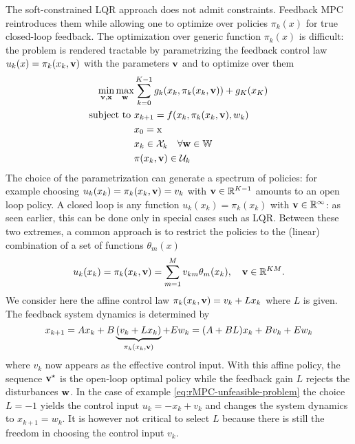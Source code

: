 The soft-constrained LQR approach does not admit constraints. Feedback MPC reintroduces them while allowing one to optimize over policies $\pi_k(x)$ for true closed-loop feedback. The optimization over generic function $\pi_k(x)$ is difficult: the problem is rendered tractable by parametrizing the feedback control law $u_k(x) = \pi_k(x_k,\boldsymbol{\mathrm{v}})$ with the parameters $\boldsymbol{\mathrm{v}}$ and to optimize over them
\begin{equation}
  \label{eq:feedback-MPC}
  \begin{aligned}
    \min_{\bsv,\bsx} \max_{\bsw} & \sum_{k=0}^{K-1} g_k(x_k,\pi_k(x_k,\bsv)) + g_K(x_K) \\
    \text{subject to } & x_{k+1} = f(x_k,\pi_k(x_k,\bsv),w_k) \\
                                 & x_0 = \mathrm{x} \\
                                 & x_k \in \mathcal{X}_k\quad \forall \bsw \in \mathbb{W} \\
                                 & \pi(x_k,\bsv) \in \mathcal{U}_k %
  \end{aligned}
\end{equation}
The choice of the parametrization can generate a spectrum of policies: for example choosing $u_k(x_k) = \pi_k(x_k,\boldsymbol{\mathrm{v}}) = v_k$ with $\boldsymbol{\mathrm{v}}\in \mathbb{R}^{K-1}$ amounts to an open loop policy. A closed loop is any function $u_k(x_k)=\pi_k(x_k)$ with $\boldsymbol{\mathrm{v}}\in \mathbb{R}^\infty$: as seen earlier, this can be done only in special cases such as LQR. Between these two extremes, a common approach is to restrict the policies to the (linear) combination of a set of functions $\theta_m(x)$
\begin{equation*}
  u_k(x_k) = \pi_k(x_k,\boldsymbol{\mathrm{v}}) = \sum_{m=1}^M v_{km}\theta_m(x_k),\quad \boldsymbol{\mathrm{v}}\in \mathbb{R}^{KM}.
\end{equation*}
We consider here the affine control law $\pi_k(x_k,\boldsymbol{\mathrm{v}}) = v_k + Lx_k$ where $L$ is given. The feedback system dynamics is determined by
\begin{equation*}
  x_{k+1} = Ax_k + B\underbrace{(v_k+Lx_k)}_{\pi_k(x_k,\boldsymbol{\mathrm{v}})} + Ew_k = (A+BL)x_k + Bv_k + Ew_k
\end{equation*}
where $v_k$ now appears as the effective control input. With this affine policy, the sequence $\boldsymbol{\mathrm{v}}^\star$ is the open-loop optimal policy while the feedback gain $L$ rejects the disturbances $\boldsymbol{\mathrm{w}}$. In the case of example \ref{eq:rMPC-unfeasible-problem} the choice $L=-1$ yields the control input $u_k=-x_k+v_k$ and changes the system dynamics to $x_{k+1}=w_k$. It is however not critical to select $L$ because there is still the freedom in choosing the control input $v_k$.

